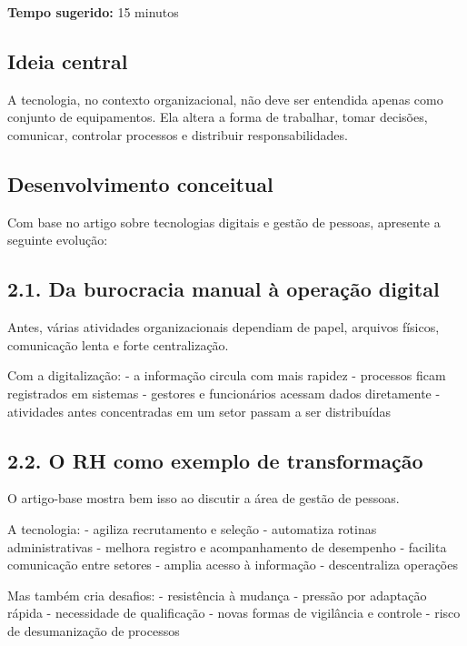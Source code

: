 \documentclass[
]{book}
\theoremstyle{definition}
\theoremstyle{definition}
\theoremstyle{definition}
\theoremstyle{definition}
\theoremstyle{remark}
\begin{document}
\textbf{Tempo sugerido:} 15 minutos

\subsection{Ideia central}\label{ideia-central}

A tecnologia, no contexto organizacional, não deve ser entendida apenas como conjunto de equipamentos. Ela altera a forma de trabalhar, tomar decisões, comunicar, controlar processos e distribuir responsabilidades.

\subsection{Desenvolvimento conceitual}\label{desenvolvimento-conceitual}

Com base no artigo sobre tecnologias digitais e gestão de pessoas, apresente a seguinte evolução:

\subsection{2.1. Da burocracia manual à operação digital}\label{da-burocracia-manual-uxe0-operauxe7uxe3o-digital}

Antes, várias atividades organizacionais dependiam de papel, arquivos físicos, comunicação lenta e forte centralização.

Com a digitalização:
- a informação circula com mais rapidez
- processos ficam registrados em sistemas
- gestores e funcionários acessam dados diretamente
- atividades antes concentradas em um setor passam a ser distribuídas

\subsection{2.2. O RH como exemplo de transformação}\label{o-rh-como-exemplo-de-transformauxe7uxe3o}

O artigo-base mostra bem isso ao discutir a área de gestão de pessoas.

A tecnologia:
- agiliza recrutamento e seleção
- automatiza rotinas administrativas
- melhora registro e acompanhamento de desempenho
- facilita comunicação entre setores
- amplia acesso à informação
- descentraliza operações

Mas também cria desafios:
- resistência à mudança
- pressão por adaptação rápida
- necessidade de qualificação
- novas formas de vigilância e controle
- risco de desumanização de processos
\end{document}
